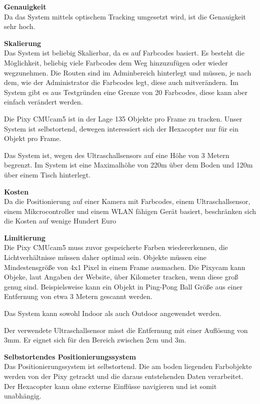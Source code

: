   \textbf{Genauigkeit}\\
  Da das System mittels optischem Tracking umgesetzt wird, ist die Genauigkeit sehr hoch.
  
  \textbf{Skalierung}\\

  Das System ist beliebig Skalierbar, da es auf Farbcodes basiert. Es besteht die Möglichkeit, beliebig viele Farbcodes dem Weg hinzuzufügen oder wieder wegzunehmen. Die Routen sind im Adminbereich hinterlegt und müssen, je nach dem, wie der Administrator die Farbcodes legt, diese auch mitverändern. Im System gibt es aus Testgründen eine Grenze von 20 Farbcodes, diese kann aber einfach verändert werden.

  Die Pixy CMUcam5 ist in der Lage 135 Objekte pro Frame zu tracken. Unser System ist selbstortend, dewegen interessiert sich der Hexacopter nur für ein Objekt pro Frame. \cite{PIXY_Porting_Examplecode}

  Das System ist, wegen des Ultraschallsensors auf eine Höhe von 3 Metern begrenzt. Im System ist eine Maximalhöhe von 220m über dem Boden und 120m über einem Tisch hinterlegt.

  \textbf{Kosten}\\
  Da  die Positionierung auf einer Kamera mit Farbcodes, einem Ultraschallsensor, einem Mikcrocontroller und einem WLAN fähigen Gerät basiert, beschränken sich die Kosten auf wenige Hundert Euro

  \textbf{Limitierung}\\
  Die Pixy CMUcam5 muss zuvor gespeicherte Farben wiedererkennen, die Lichtverhältnisse müssen daher optimal sein.  
  Objekte müssen eine Mindestensgröße von 4x1 Pixel in einem Frame ausmachen. Die Pixycam kann Objeke, laut Angaben der Website, über Kilometer tracken, wenn diese groß genug sind. Beispielsweise kann ein Objekt in Ping-Pong Ball Größe aus einer Entfernung von etwa 3 Metern gescannt werden. 
  \cite{Pixy}

  Das System kann sowohl Indoor als auch Outdoor angewendet werden.

  Der verwendete Ultraschallsensor misst die Entfernung mit einer Auflösung von 3mm. Er eignet sich für den Bereich zwischen 2cm und 3m. 
  \cite{Ultrasonic}

  \textbf{Selbstortendes Positionierungssystem}\\
  Das Positionierungssystem ist selbstortend. Die am boden liegenden Farbobjekte werden von der Pixy getrackt und die daraus entstehenden Daten verarbeitet. Der Hexacopter kann ohne externe Einflüsse navigieren und ist somit unabhängig.


